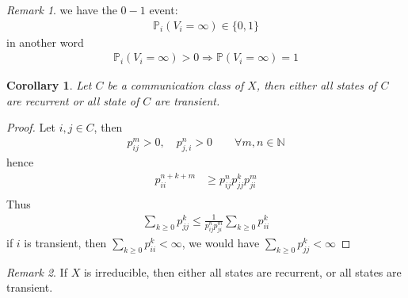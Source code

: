\documentclass[a4paper,11pt]{book}
\newtheorem{corollary}{Corollary}[theorem]
\theoremstyle{definition}
\theoremstyle{remark}
\newtheorem*{remark}{Remark}
\begin{document}
\begin{remark}
we have the $0-1$ event:
\begin{align*}
	\mathbb{P}_i(V_i = \infty ) \in \{0, 1\}
\end{align*}	
in another word
\begin{align*}
	\mathbb{P}_i(V_i = \infty)> 0 \Rightarrow \mathbb{P}(V_i = \infty) = 1
\end{align*}
\end{remark}

\begin{corollary}
	Let $C$ be a communication class of $X$, then either all states of $C$ are recurrent or all state of $C$ are transient.
\end{corollary}
\begin{proof}
	Let $i, j \in C$, then
	\begin{align*}
		p_{ij}^m > 0, \quad p_{j, i}^n > 0 \qquad \forall m, n \in \mathbb{N}
	\end{align*}
	hence
	\begin{align*}
		p_{ii}^{n+k+m} &\geq p_{ij}^n p_{jj}^k p_{ji}^m\\
	\end{align*}
	Thus 
	\begin{align*}
		\sum_{k \geq 0} p_{jj}^k \le \frac{1}{p_{ij}^n p_{ji}^m} \sum_{k \geq
		 0} p_{ii}^k
	\end{align*}
	if $i$ is transient, then $\sum_{k \geq 0} p_{ii}^k < \infty$, we would have $\sum_{k \geq 0} p_{jj}^k < \infty$ 
\end{proof}
\begin{remark}
If $X$ is irreducible, then either all states are recurrent, or all states are transient.	
\end{remark}
\end{document}
